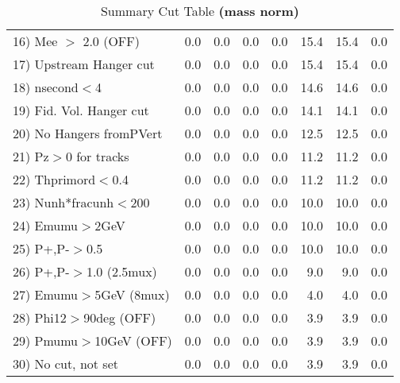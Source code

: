 \begin{table}[h!]
{{\begin{tabular}{||l||r|r|r|r|r||r||r||}
 16) Mee $>$ 2.0  (OFF)   &       0.0 &       0.0 &       0.0 &       0.0 &      15.4 &      15.4 &       0.0 \\
 17) Upstream Hanger cut  &       0.0 &       0.0 &       0.0 &       0.0 &      15.4 &      15.4 &       0.0 \\
 18) nsecond$<$4          &       0.0 &       0.0 &       0.0 &       0.0 &      14.6 &      14.6 &       0.0 \\
 19) Fid. Vol. Hanger cut &       0.0 &       0.0 &       0.0 &       0.0 &      14.1 &      14.1 &       0.0 \\
 20) No Hangers fromPVert &       0.0 &       0.0 &       0.0 &       0.0 &      12.5 &      12.5 &       0.0 \\
 21) Pz$>$0 for tracks    &       0.0 &       0.0 &       0.0 &       0.0 &      11.2 &      11.2 &       0.0 \\
 22) Thprimord$<$0.4      &       0.0 &       0.0 &       0.0 &       0.0 &      11.2 &      11.2 &       0.0 \\
 23) Nunh*fracunh$<$200   &       0.0 &       0.0 &       0.0 &       0.0 &      10.0 &      10.0 &       0.0 \\
 24) Emumu$>$2GeV         &       0.0 &       0.0 &       0.0 &       0.0 &      10.0 &      10.0 &       0.0 \\
 25) P+,P-$>$0.5          &       0.0 &       0.0 &       0.0 &       0.0 &      10.0 &      10.0 &       0.0 \\
 26) P+,P-$>$1.0 (2.5mux) &       0.0 &       0.0 &       0.0 &       0.0 &       9.0 &       9.0 &       0.0 \\
 27) Emumu$>$5GeV  (8mux) &       0.0 &       0.0 &       0.0 &       0.0 &       4.0 &       4.0 &       0.0 \\
 28) Phi12$>$90deg  (OFF) &       0.0 &       0.0 &       0.0 &       0.0 &       3.9 &       3.9 &       0.0 \\
 29) Pmumu$>$10GeV  (OFF) &       0.0 &       0.0 &       0.0 &       0.0 &       3.9 &       3.9 &       0.0 \\
 30) No cut, not set      &       0.0 &       0.0 &       0.0 &       0.0 &       3.9 &       3.9 &       0.0 \\
 \hline
 \hline
 \end{tabular}
 \caption{Summary Cut Table \textbf{ (mass norm) }}
 \label{tab-sumcut}
 }}
 \end{table}
 \endinput
